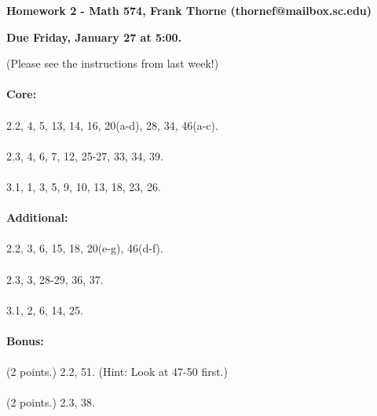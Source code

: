\documentclass[12pt]{article}
\begin{document}
\setlength{\topmargin}{-2mm}





\begin{center}{\bf Homework 2 - Math 574, Frank Thorne (thornef@mailbox.sc.edu)}
\end{center}
\begin{center}
{\bf Due Friday, January 27 at 5:00.}
\end{center}

(Please see the instructions from last week!)
\\
\\
{\bf Core:} 
\\
\\
2.2, 4, 5, 13, 14, 16, 20(a-d), 28, 34, 46(a-c).
\\
\\
2.3, 4, 6, 7, 12, 25-27, 33, 34, 39.
\\
\\
3.1, 1, 3, 5, 9, 10, 13, 18, 23, 26.
\\
\\
{\bf Additional:}
\\
\\
2.2, 3, 6, 15, 18, 20(e-g), 46(d-f).
\\
\\
2.3, 3, 28-29, 36, 37.
\\
\\
3.1, 2, 6, 14, 25.
\\
\\
{\bf Bonus:}
\\
\\
(2 points.) 2.2, 51. (Hint: Look at 47-50 first.)
\\
\\
(2 points.) 2.3, 38.
\end{document}
